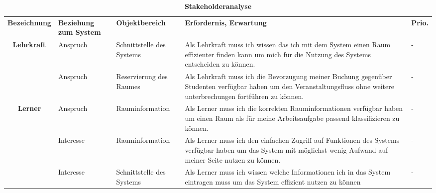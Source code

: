 \begin{table}
	
 	\caption{\textbf{Stakeholderanalyse}}
 	\begin{tabularx}{\textwidth}{|c|X|X|X|m{}|}			
 		\rowcolor{heading}\textbf{Bezeichnung} & \textbf{Beziehung zum System} & \textbf{Objektbereich} & \textbf{Erfordernis, Erwartung} & \textbf{Prio.}\\
			 
\rowcolor{odd} \textbf{Lehrkraft} & Anspruch & Schnittstelle des Systems & 	Als Lehrkraft muss ich wissen das ich mit dem System einen Raum effizienter finden kann um mich für die Nutzung des Systems entscheiden zu können. & -\\
		 & Anspruch & Reservierung des Raumes & Als Lehrkraft muss ich die Bevorzugung meiner Buchung gegenüber Studenten verfügbar haben um den Veranstaltungsfluss ohne weitere unterbrechungen fortführen zu können. & -\\ \hline

\rowcolor{odd} \textbf{Lerner} & Anspruch & Rauminformation & 	Als Lerner muss ich die korrekten Rauminformationen verfügbar haben um einen Raum als für meine Arbeitsaufgabe passend klassifizieren zu können. & -\\
		 & Interesse & Rauminformation & Als Lerner muss ich den einfachen Zugriff auf Funktionen des Systems verfügbar haben um das System mit möglichst wenig Aufwand auf meiner Seite nutzen zu können. & -\\
\rowcolor{odd} & Interesse & Schnittstelle des Systems & Als Lerner muss ich wissen welche Informationen ich in das System eintragen muss um das System effizient nutzen zu können & -\\ \hline
 	\end{tabularx}
 	
\end{table}

